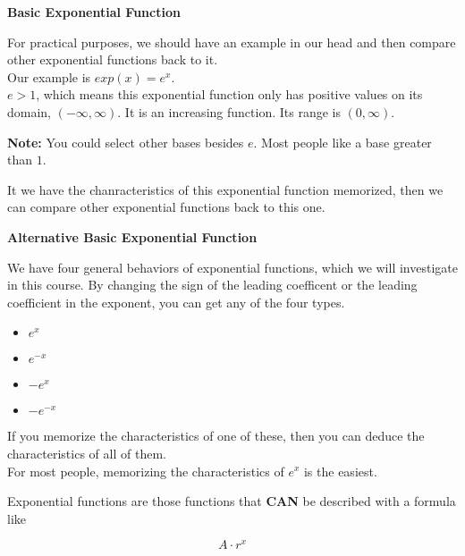 \documentclass{ximera}
\begin{document}
\begin{idea} \textbf{\textcolor{red!80!black}{Basic Exponential Function}}


For practical purposes, we should have an example in our head and then compare other exponential functions back to it. \\

Our example is  $exp(x) = e^x$. \\


$e > 1$, which means this exponential function only has positive values on its domain, $(-\infty, \infty)$.  It is an increasing function. Its range is $(0, \infty)$.

\textbf{Note:} You could select other bases besides $e$.  Most people like a base greater than $1$.


\end{idea}

It we have the chanracteristics of this exponential function memorized, then we can compare other exponential functions back to this one.





\begin{idea} \textbf{\textcolor{red!80!black}{Alternative Basic Exponential Function}}


We have four general behaviors of exponential functions, which we will investigate in this course. By changing the sign of the leading coefficent or the leading coefficient in the exponent, you can get any of the four  types.  


\begin{itemize}
\item $e^x$
\item $e^{-x}$
\item $-e^x$
\item $-e^{-x}$
\end{itemize}


If you memorize the characteristics of one of these, then you can deduce the characteristics of all of them. \\

For most people, memorizing the characteristics of $e^x$ is the easiest.


\end{idea}




Exponential functions are those functions that \textbf{\textcolor{purple!85!blue}{CAN}} be described with a formula like 

\[
A \cdot r^x
\]
\end{document}
